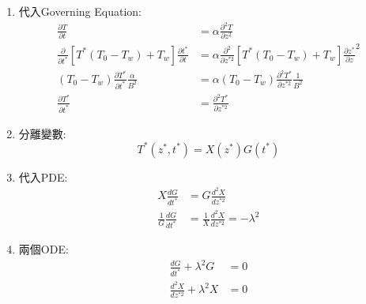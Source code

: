 \documentclass[../main.tex]{subfiles}
\begin{document}
\begin{itemize}
\begin{enumerate}
\begin{equation}
    \end{equation}
    時間的無因次化:\\
    列出$\alpha, T, z$的單位並嘗試表示:
    \begin{align}
      [\alpha] &= [L]^2[T]^{-1}\\
      [T] &= [K]\\
      [z] &= [L]
    \end{align}
    可以發現時間的單位可以由$\alpha$和$z$組合出來:
    \begin{equation}
      [t] = \frac{[z]^2}{[\alpha]} = [T]
    \end{equation}
    故時間的無因次化為:
    \begin{equation}
      t^\ast = \frac{t \alpha}{B^2}
    \end{equation}
    \item 代入Governing Equation:
    \begin{align}
      \frac{\partial T}{\partial t} &= \alpha \frac{\partial^2 T}{\partial z^2}\nonumber\\
      \frac{\partial}{\partial t^\ast} \left[
        T^\ast (T_0 - T_w) + T_w
      \right] \frac{\partial t^\ast}{\partial t} &= \alpha \frac{\partial^2}{\partial z^{\ast 2}} \left[
        T^\ast (T_0 - T_w) + T_w
      \right] \frac{\partial z^\ast}{\partial z}^2\nonumber\\
      (T_0 - T_w) \frac{\partial T^\ast}{\partial t^\ast} \frac{\alpha}{B^2} &= \alpha (T_0 - T_w) 
      \frac{\partial^2 T^\ast}{\partial z^{\ast 2}} \frac{1}{B^2}\nonumber\\
      \frac{\partial T^\ast}{\partial t^\ast} &= \frac{\partial^2 T^\ast}{\partial z^{\ast 2}}
    \end{align}
    \item 分離變數:
    \begin{equation}
      T^\ast(z^\ast,t^\ast) = X(z^\ast) G(t^\ast)
    \end{equation}
    \item 代入PDE:
    \begin{align}
      X \frac{dG}{dt^\ast} &= G \frac{d^2 X}{dz^{\ast 2}}\nonumber\\
      \frac{1}{G} \frac{dG}{dt^\ast} &= \frac{1}{X} \frac{d^2 X}{dz^{\ast 2}} = -\lambda^2
    \end{align}
    \item 兩個ODE:
    \begin{align}
      \frac{dG}{dt^\ast} + \lambda^2 G &= 0\\
      \frac{d^2 X}{dz^{\ast 2}} + \lambda^2 X &= 0

\end{align}
\end{enumerate}
\end{itemize}
\end{document}

